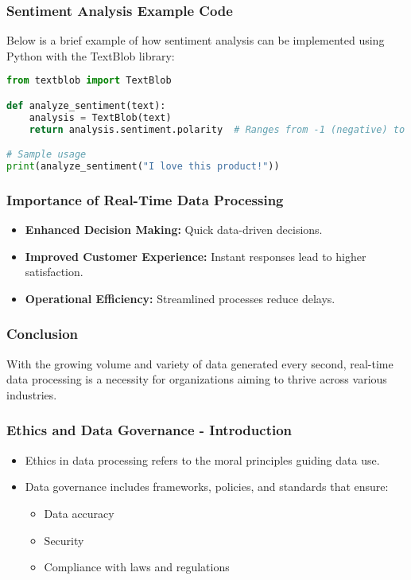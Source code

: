 \documentclass[aspectratio=169]{beamer}
\begin{document}
\begin{frame}[fragile]
    \frametitle{Sentiment Analysis Example Code}
    Below is a brief example of how sentiment analysis can be implemented using Python with the TextBlob library:

    \begin{lstlisting}[language=Python]
from textblob import TextBlob

def analyze_sentiment(text):
    analysis = TextBlob(text)
    return analysis.sentiment.polarity  # Ranges from -1 (negative) to +1 (positive)

# Sample usage
print(analyze_sentiment("I love this product!"))
    \end{lstlisting}
\end{frame}

\begin{frame}[fragile]
    \frametitle{Importance of Real-Time Data Processing}
    \begin{itemize}
        \item \textbf{Enhanced Decision Making:} Quick data-driven decisions.
        \item \textbf{Improved Customer Experience:} Instant responses lead to higher satisfaction.
        \item \textbf{Operational Efficiency:} Streamlined processes reduce delays.
    \end{itemize}
\end{frame}

\begin{frame}[fragile]
    \frametitle{Conclusion}
    With the growing volume and variety of data generated every second, real-time data processing is a necessity for organizations aiming to thrive across various industries.
\end{frame}

\begin{frame}[fragile]
    \frametitle{Ethics and Data Governance - Introduction}
    \begin{itemize}
        \item Ethics in data processing refers to the moral principles guiding data use.
        \item Data governance includes frameworks, policies, and standards that ensure:
        \begin{itemize}
            \item Data accuracy
            \item Security
            \item Compliance with laws and regulations
        \end{itemize}
    \end{itemize}
\end{frame}
\end{document}
